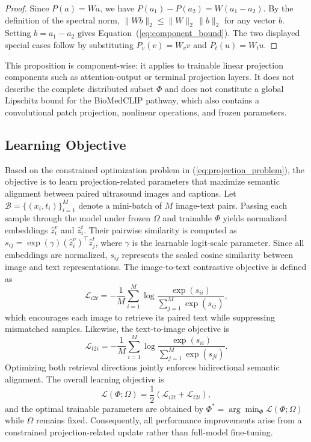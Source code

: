 \documentclass[runningheads]{llncs}
\begin{document}
\begin{proof}
Since $P(a)=Wa$, we have $P(a_1)-P(a_2)=W(a_1-a_2)$. By the definition of the spectral norm, $\|Wb\|_2\le \|W\|_2\,\|b\|_2$ for any vector $b$. Setting $b=a_1-a_2$ gives Equation~(\ref{eq:component_bound}). The two displayed special cases follow by substituting $P_v(v)=W_vv$ and $P_t(u)=W_tu$.
\end{proof}

This proposition is component-wise: it applies to trainable linear projection components such as attention-output or terminal projection layers. It does not describe the complete distributed subset $\Phi$ and does not constitute a global Lipschitz bound for the BioMedCLIP pathway, which also contains a convolutional patch projection, nonlinear operations, and frozen parameters.


\subsection{Learning Objective}

Based on the constrained optimization problem in (\ref{eq:projection_problem}), the objective is to learn projection-related parameters that maximize semantic alignment between paired ultrasound images and captions. Let $\mathcal{B}=\{(x_i,t_i)\}_{i=1}^{M}$ denote a mini-batch of $M$ image-text pairs. Passing each sample through the model under frozen $\Omega$ and trainable $\Phi$ yields normalized embeddings $\hat z_i^{v}$ and $\hat z_i^{t}$. Their pairwise similarity is computed as $s_{ij}=\exp(\gamma)(\hat z_i^{v})^{\top}\hat z_j^{t}$, where $\gamma$ is the learnable logit-scale parameter. Since all embeddings are normalized, $s_{ij}$ represents the scaled cosine similarity between image and text representations.
The image-to-text contrastive objective is defined as
\begin{equation}
\label{eq:i2t_loss}
\mathcal{L}_{i2t}=-\frac{1}{M}\sum_{i=1}^{M}\log\frac{\exp(s_{ii})}{\sum_{j=1}^{M}\exp(s_{ij})},
\end{equation}
which encourages each image to retrieve its paired text while suppressing mismatched samples. Likewise, the text-to-image objective is
\begin{equation}
\label{eq:t2i_loss}
\mathcal{L}_{t2i}=-\frac{1}{M}\sum_{i=1}^{M}\log\frac{\exp(s_{ii})}{\sum_{j=1}^{M}\exp(s_{ji})}.
\end{equation}
Optimizing both retrieval directions jointly enforces bidirectional semantic alignment. The overall learning objective is
\begin{equation}
\label{eq:loss}
\mathcal{L}(\Phi;\Omega)=\frac{1}{2}\left(\mathcal{L}_{i2t}+\mathcal{L}_{t2i}\right),
\end{equation}
and the optimal trainable parameters are obtained by $\Phi^{*}=\arg\min_{\Phi}\mathcal L(\Phi;\Omega)$ while $\Omega$ remains fixed. Consequently, all performance improvements arise from a constrained projection-related update rather than full-model fine-tuning.
\end{document}
